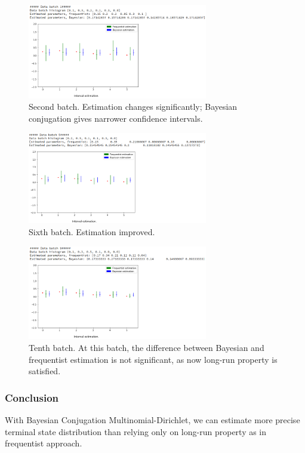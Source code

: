 \documentclass[12pt]{article}
\theoremstyle{definition}
\begin{document}
\begin{figure}[H]
  \centering
  \includegraphics[width=0.7\textwidth,keepaspectratio]{figures/ex1_2.png}
  \caption{Second batch. Estimation changes significantly; Bayesian conjugation
    gives narrower confidence intervals.}
\end{figure}

\begin{figure}[H]
  \centering
  \includegraphics[width=0.7\textwidth,keepaspectratio]{figures/ex1_3.png}
  \caption{Sixth batch. Estimation improved.}
\end{figure}

\begin{figure}[H]
  \centering
  \includegraphics[width=0.7\textwidth,keepaspectratio]{figures/ex1_4.png}
  \caption{Tenth batch. At this batch, the difference between Bayesian and
    frequentist estimation is not significant, as now long-run property is satisfied.}
\end{figure}

\subsubsection{Conclusion}
With Bayesian Conjugation Multinomial-Dirichlet, we can estimate more precise
terminal state distribution than relying only on long-run property as in
frequentist approach.
\end{document}
